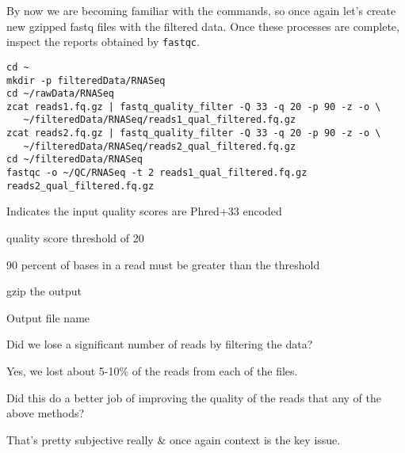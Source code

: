 \begin{steps}
By now we are becoming familiar with the commands, so once again let's create new gzipped fastq files with the filtered data.
Once these processes are complete, inspect the reports obtained by \texttt{fastqc}.
\begin{lstlisting}
cd ~
mkdir -p filteredData/RNASeq
cd ~/rawData/RNASeq
zcat reads1.fq.gz | fastq_quality_filter -Q 33 -q 20 -p 90 -z -o \
   ~/filteredData/RNASeq/reads1_qual_filtered.fq.gz
zcat reads2.fq.gz | fastq_quality_filter -Q 33 -q 20 -p 90 -z -o \
   ~/filteredData/RNASeq/reads2_qual_filtered.fq.gz
cd ~/filteredData/RNASeq
fastqc -o ~/QC/RNASeq -t 2 reads1_qual_filtered.fq.gz reads2_qual_filtered.fq.gz
\end{lstlisting}
\end{steps}

\begin{note}
\begin{description}[style=multiline,labelindent=0cm,align=right,leftmargin=0.8\descriptionlabelspace,rightmargin=1.5cm,font=\ttfamily]
\item[-Q 33] Indicates the input quality scores are Phred+33 encoded
\item[-q 20] quality score threshold of 20
\item[-p 90] 90 percent of bases in a read must be greater than the threshold
\item[-z] gzip the output
\item[-o] Output file name
\end{description}
\end{note}

\begin{questions}
Did we lose a significant number of reads by filtering the data? \\
\begin{answer}
Yes, we lost about 5-10\% of the reads from each of the files. \\
\end{answer}

Did this do a better job of improving the quality of the reads that any of the above methods? \\
\begin{answer}
That's pretty subjective really \& once again context is the key issue. \\
\end{answer}
\end{questions}

